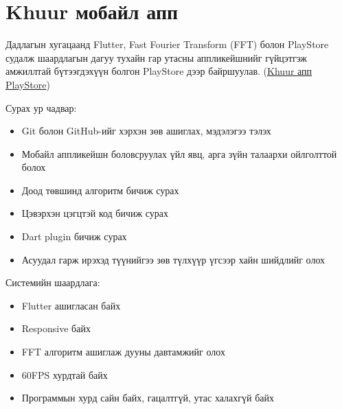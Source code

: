 \section{Khuur мобайл апп}

Дадлагын хугацаанд Flutter, Fast Fourier Transform (FFT) болон PlayStore судалж шаардлагын дагуу тухайн гар утасны аппликейшнийг гүйцэтгэж амжиллтай бүтээгдэхүүн болгон PlayStore дээр байршуулав. (\href{https://play.google.com/store/apps/details?id=com.khuur.v2_khuur_app}{Khuur апп PlayStore})

Сурах ур чадвар: 
\begin{itemize}
    \item Git болон GitHub-ийг хэрхэн зөв ашиглах, мэдэлэгээ тэлэх
    \item Мобайл аппликейшн боловсруулах үйл явц, арга зүйн талаархи ойлголттой болох
    \item Доод төвшинд алгоритм бичиж сурах
    \item Цэвэрхэн цэгцтэй код бичиж сурах
    \item Dart plugin бичиж сурах
    \item Асуудал гарж ирэхэд түүнийгээ зөв түлхүүр үгсээр хайн шийдлийг олох
\end{itemize}

Системийн шаардлага: 
\begin{itemize}
    \item Flutter ашигласан байх
    \item Responsive байх
    \item FFT алгоритм ашиглаж дууны давтамжийг олох
    \item 60FPS хурдтай байх
    \item Программын хурд сайн байх, гацалтгүй, утас халахгүй байх
\end{itemize}


